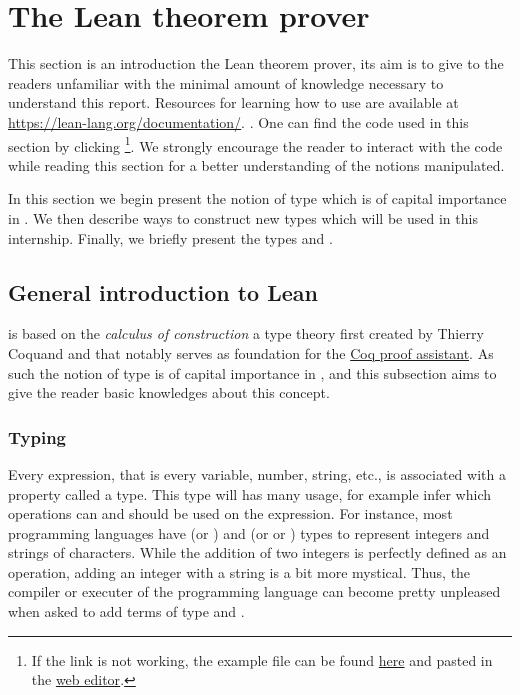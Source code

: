 \section{The Lean theorem prover}
\label{sec:lean-intro}

This section is an introduction the Lean theorem prover, its aim is to give to the readers unfamiliar with \Lean the minimal amount of knowledge necessary to understand this report. Resources for learning how to use \Lean are available at \url{https://lean-lang.org/documentation/}.
. One can find the code used in this section by clicking \editor\footnote{If the link is not working, the example file can be found \href{https://github.com/corent1234/BNpairs/blob/master/report/example.lean}{here} and pasted in the \href{https://live.lean-lang.org/}{ web editor}.}. We strongly encourage the reader to interact with the code while reading this section for a better understanding of the notions manipulated.

In this section we begin present the notion of type which is of capital importance in \Lean. We then describe ways to construct new types which will be used in this internship. Finally, we briefly present the types  and .

\subsection{General introduction to Lean}%
\label{sub:Introduction to type theory}

\Lean is based on the \emph{calculus of construction} a type theory first created by Thierry Coquand and that notably serves as foundation for the \href{https://coq.inria.fr/}{Coq proof assistant}. As such the notion of type is of capital importance in \Lean, and this subsection aims to give the reader basic knowledges about this concept.

\subsubsection{Typing}
  Every \Lean expression, that is every variable, number, string, etc., is associated with a property called a type. This type will has many usage, for example infer which operations can and should be used on the expression. For instance, most programming languages have  (or ) and  (or  or ) types to represent integers and strings of characters. While the addition of two integers is perfectly defined as an operation, adding an integer with a string is a bit more mystical. Thus, the compiler or executer of the programming language can become pretty unpleased when asked to add terms of type  and .

